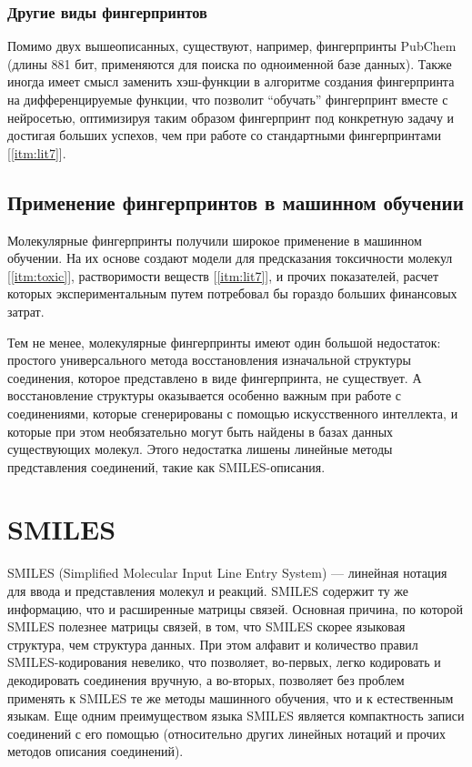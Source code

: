 \documentclass[a4paper,14pt]{extreport}
\begin{document}
  \subsection{Другие виды фингерпринтов}
  \label{ss:fp_other_subsec}
  Помимо двух вышеописанных, существуют, например, фингерпринты PubChem (длины 881 бит, применяются для поиска по одноименной базе данных). Также иногда имеет смысл заменить хэш-функции в алгоритме создания фингерпринта на дифференцируемые функции, что позволит “обучать” фингерпринт вместе с нейросетью, оптимизируя таким образом фингерпринт под конкретную задачу и достигая больших успехов, чем при работе со стандартными фингерпринтами [\ref{itm:lit7}].
  
  \section{Применение фингерпринтов в машинном обучении}
  \label{s:fp_application}
  Молекулярные фингерпринты получили широкое применение в машинном обучении. На их основе создают модели для предсказания токсичности молекул [\ref{itm:toxic}], растворимости веществ [\ref{itm:lit7}], и прочих показателей, расчет которых экспериментальным путем потребовал бы гораздо больших финансовых затрат.
  
Тем не менее, молекулярные фингерпринты имеют один большой недостаток: простого универсального метода восстановления изначальной структуры соединения, которое представлено в виде фингерпринта, не существует. А восстановление структуры оказывается особенно важным при работе с соединениями, которые сгенерированы с помощью искусственного интеллекта, и которые при этом необязательно могут быть найдены в базах данных существующих молекул.
Этого недостатка лишены линейные методы представления соединений, такие как SMILES-описания.

  
  \chapter{SMILES}
  \label{c:smiles}
  SMILES (Simplified Molecular Input Line Entry System) — линейная нотация для ввода и представления молекул и реакций. SMILES содержит ту же информацию, что и расширенные матрицы связей. Основная причина, по которой SMILES полезнее матрицы связей, в том, что SMILES скорее языковая структура, чем структура данных. При этом алфавит и количество правил SMILES-кодирования невелико, что позволяет, во-первых, легко кодировать и декодировать соединения вручную, а во-вторых, позволяет без проблем применять к SMILES те же методы машинного обучения, что и к естественным языкам.
Еще одним преимуществом языка SMILES является компактность записи соединений с его помощью (относительно других линейных нотаций и прочих методов описания соединений).
\end{document}
